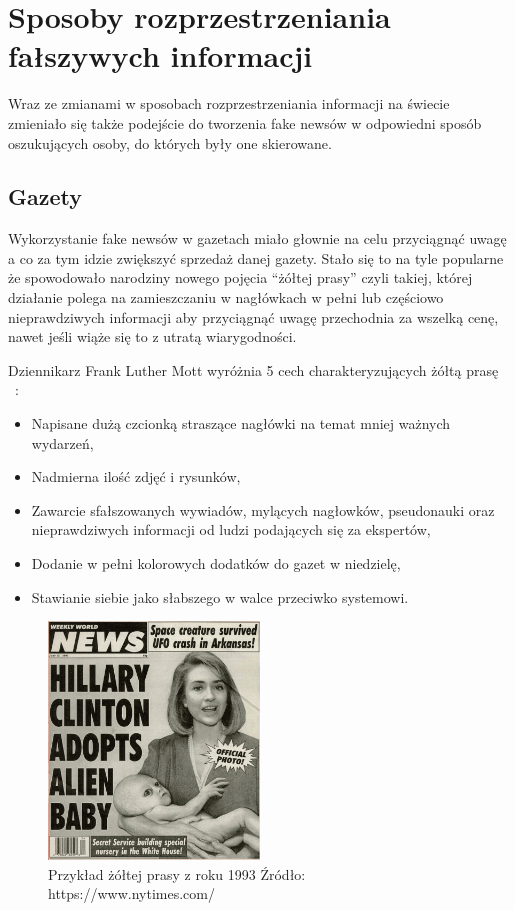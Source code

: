 \section{Sposoby rozprzestrzeniania fałszywych informacji}
Wraz ze zmianami w sposobach rozprzestrzeniania informacji na świecie zmieniało się
także podejście do tworzenia fake newsów w odpowiedni sposób oszukujących osoby, do których 
były one skierowane. 

\subsection{Gazety}
Wykorzystanie fake newsów w gazetach miało głownie na celu przyciągnąć uwagę a co za 
tym idzie zwiększyć sprzedaż danej gazety. Stało się to na tyle popularne że spowodowało
narodziny nowego pojęcia ``żółtej prasy'' czyli takiej, której działanie polega na zamieszczaniu 
w nagłówkach w pełni lub częściowo nieprawdziwych informacji aby przyciągnąć uwagę przechodnia 
za wszelką cenę, nawet jeśli wiąże się to z utratą wiarygodności. 

Dziennikarz Frank Luther Mott wyróżnia 5 cech charakteryzujących 
żółtą prasę ~\cite{YellowPressFrank}:
\begin{itemize}
    \item Napisane dużą czcionką straszące nagłówki na temat mniej ważnych wydarzeń,
    \item Nadmierna ilość zdjęć i rysunków,
    \item Zawarcie sfałszowanych wywiadów, mylących nagłowków, pseudonauki oraz nieprawdziwych informacji od ludzi podających się za ekspertów,
    \item Dodanie w pełni kolorowych dodatków do gazet w niedzielę,
    \item Stawianie siebie jako słabszego w walce przeciwko systemowi.
\end{itemize}

\begin{figure}[h!]
    \centering
    \includegraphics[width=0.5\textwidth]{./Img/fake-newspaper.jpg}
    \caption{Przykład żółtej prasy z roku 1993 Źródło: https://www.nytimes.com/}
\end{figure}

